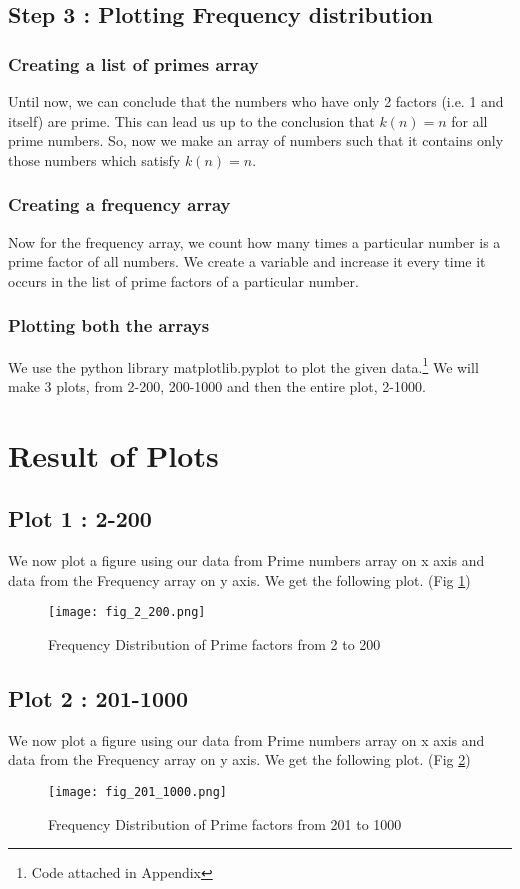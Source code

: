\documentclass[12pt]{article}
\begin{document}
     \subsection{Step 3 : Plotting Frequency distribution}
        \subsubsection{Creating a list of primes array}
            Until now, we can conclude that the numbers who have only 2 factors (i.e. 1 and itself) are prime. This can lead us up to the conclusion that $k(n) = n$ for all prime numbers.
            So, now we make an array of numbers such that it contains only those numbers which satisfy $k(n)=n$.
        \subsubsection{Creating a frequency array}
            Now for the frequency array, we count how many times a particular number is a prime factor of all numbers.
            We create a variable and increase it every time it occurs in the list of prime factors of a particular number.
        \subsubsection{Plotting both the arrays}
            We use the python library matplotlib.pyplot to plot the given data.\footnote{Code attached in Appendix}  We will make 3 plots, from 2-200, 200-1000 and then the entire plot, 2-1000.
        
\section{Result of Plots}
    \subsection{Plot 1 : 2-200}
        We now plot a figure using our data from Prime numbers array on x axis and data from the Frequency array on y axis.
        We get the following plot. (Fig \ref{fig:2-200})
        \begin{figure}[H]
            \centering
            \texttt{[image: fig\_2\_200.png]}
            \caption{Frequency Distribution of Prime factors from 2 to 200}
            \label{fig:2-200}
        \end{figure}
    \newpage
    \subsection{Plot 2 : 201-1000}
        We now plot a figure using our data from Prime numbers array on x axis and data from the Frequency array on y axis.
        We get the following plot. (Fig \ref{fig:201-1000})
        \begin{figure}[H]
            \centering
            \texttt{[image: fig\_201\_1000.png]}
            \caption{Frequency Distribution of Prime factors from 201 to 1000}
            \label{fig:201-1000}
        \end{figure}   
    \newpage
\end{document}
